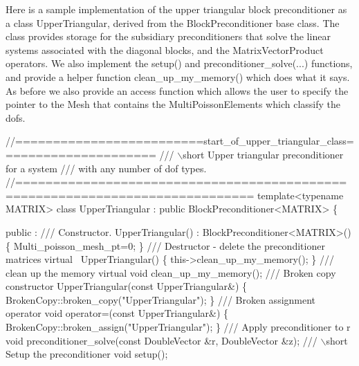 Here is a sample implementation of the upper triangular block preconditioner as a class {\ttfamily Upper\+Triangular}, derived from the {\ttfamily Block\+Preconditioner} base class. The class provides storage for the subsidiary preconditioners that solve the linear systems associated with the diagonal blocks, and the {\ttfamily Matrix\+Vector\+Product} operators. We also implement the {\ttfamily setup()} and {\ttfamily preconditioner\+\_\+solve}(...) functions, and provide a helper function {\ttfamily clean\+\_\+up\+\_\+my\+\_\+memory()} which does what it says. As before we also provide an access function which allows the user to specify the pointer to the {\ttfamily Mesh} that contains the {\ttfamily Multi\+Poisson\+Elements} which classify the dofs.

 
\begin{DoxyCodeInclude}
\textcolor{comment}{//=========================start\_of\_upper\_triangular\_class=====================}
\textcolor{comment}{/// \(\backslash\)short Upper triangular preconditioner for a system }
\textcolor{comment}{}\textcolor{comment}{/// with any number of dof types.}
\textcolor{comment}{}\textcolor{comment}{//=============================================================================}
 \textcolor{keyword}{template}<\textcolor{keyword}{typename} MATRIX> 
 \textcolor{keyword}{class }UpperTriangular : \textcolor{keyword}{public} BlockPreconditioner<MATRIX>
 \{
 
 public :
 \textcolor{comment}{}
\textcolor{comment}{  /// Constructor.}
\textcolor{comment}{}  UpperTriangular() : BlockPreconditioner<MATRIX>()
   \{
    Multi\_poisson\_mesh\_pt=0;
   \}
 \textcolor{comment}{}
\textcolor{comment}{  /// Destructor - delete the preconditioner matrices}
\textcolor{comment}{}  \textcolor{keyword}{virtual} ~UpperTriangular()
   \{
    this->clean\_up\_my\_memory();
   \}
\textcolor{comment}{}
\textcolor{comment}{  /// clean up the memory}
\textcolor{comment}{}  \textcolor{keyword}{virtual} \textcolor{keywordtype}{void} clean\_up\_my\_memory();
 \textcolor{comment}{}
\textcolor{comment}{  /// Broken copy constructor}
\textcolor{comment}{}  UpperTriangular(\textcolor{keyword}{const} UpperTriangular&) 
   \{ 
    BrokenCopy::broken\_copy(\textcolor{stringliteral}{"UpperTriangular"});
   \} 
  \textcolor{comment}{}
\textcolor{comment}{  /// Broken assignment operator}
\textcolor{comment}{}  \textcolor{keywordtype}{void} operator=(\textcolor{keyword}{const} UpperTriangular&) 
   \{
    BrokenCopy::broken\_assign(\textcolor{stringliteral}{"UpperTriangular"});
   \}
  \textcolor{comment}{}
\textcolor{comment}{  /// Apply preconditioner to r}
\textcolor{comment}{}  \textcolor{keywordtype}{void} preconditioner\_solve(\textcolor{keyword}{const} DoubleVector &r, DoubleVector &z);
 \textcolor{comment}{}
\textcolor{comment}{  /// \(\backslash\)short Setup the preconditioner }
\textcolor{comment}{}  \textcolor{keywordtype}{void} setup();
  

\end{DoxyCodeInclude}

